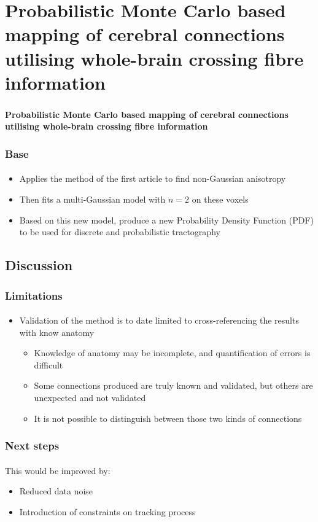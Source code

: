 \documentclass[10pt]{beamer}
\begin{document}
\section{Probabilistic Monte Carlo based mapping of cerebral connections utilising whole-brain crossing fibre information}
\begin{frame}
  \frametitle{}
  \framesubtitle{}

  \begin{Large}
  \begin{center}
  \textbf{Probabilistic Monte Carlo based mapping of cerebral connections utilising whole-brain crossing fibre information}
  \end{center}
  \end{Large}
\end{frame}

\begin{frame}
  \frametitle{Base}
  \framesubtitle{}

  \begin{itemize}
    \item Applies the method of the first article to find non-Gaussian anisotropy
    \item Then fits a multi-Gaussian model with $n=2$ on these voxels
    \item Based on this new model, produce a new Probability Density Function (PDF) to be used for discrete and probabilistic tractography
  \end{itemize}
\end{frame}

  \subsection{Discussion}
  \begin{frame}
    \frametitle{Limitations}
    \framesubtitle{}

    \begin{itemize}
      \item Validation of the method is to date limited to cross-referencing the results
with know anatomy
        \begin{itemize}
          \item Knowledge of anatomy may be incomplete, and quantification of errors is difficult
          \item Some connections produced are truly known and validated, but others are unexpected and not validated
          \item It is not possible to distinguish between those two kinds of connections
        \end{itemize}
    \end{itemize}
  \end{frame}

  \begin{frame}
    \frametitle{Next steps}
    \framesubtitle{}

    This would be improved by:
    \begin{itemize}
      \item Reduced data noise
      \item Introduction of constraints on tracking process
    \end{itemize}
  \end{frame}
\end{document}
